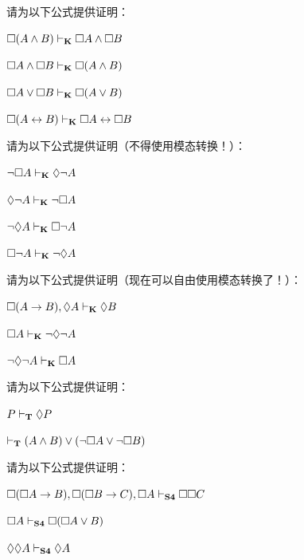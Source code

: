 \practiceproblems

\problempart
请为以下公式提供证明：

\begin{compactlist}
	\item $\Box (A\wedge B)\vdash_{\mathbf{K}}\Box A \wedge \Box B$
	\item $\Box A\wedge\Box B\vdash_{\mathbf{K}}\Box( A \wedge  B)$
	\item $\Box A\vee\Box B\vdash_{\mathbf{K}}\Box( A \vee  B)$
	\item $\Box (A \leftrightarrow B)\vdash_{\mathbf{K}} \Box A \leftrightarrow \Box B$
\end{compactlist}

\problempart
请为以下公式提供证明（不得使用模态转换！）：

\begin{compactlist}
	\item $\neg\Box A\vdash_{\mathbf{K}} \Diamond \neg A$
	\item $\Diamond\neg A\vdash_{\mathbf{K}}\neg \Box A$
	\item $\neg\Diamond A\vdash_{\mathbf{K}}\Box\neg A$
	\item $\Box\neg A\vdash_{\mathbf{K}}\neg\Diamond A$
\end{compactlist}

\problempart
请为以下公式提供证明（现在可以自由使用模态转换了！）：

\begin{compactlist}
	\item $\Box(A\rightarrow B), \Diamond A \vdash_{\mathbf{K}} \Diamond B$
	\item $\Box A \vdash_{\mathbf{K}} \neg\Diamond\neg A$
	\item $\neg\Diamond\neg A \vdash_{\mathbf{K}} \Box A$
\end{compactlist}

\problempart
请为以下公式提供证明：

\begin{compactlist}
	\item $P\vdash_{\mathbf{T}}\Diamond P$
	\item $\vdash_{\mathbf{T}} (A\wedge B)\vee(\neg \Box A\vee\neg\Box B)$
\end{compactlist}

\problempart
请为以下公式提供证明：

\begin{compactlist}
	\item $\Box(\Box A\rightarrow B), \Box (\Box B\rightarrow C), \Box A \vdash_{\mathbf{S4}} \Box\Box C$
	\item $\Box A \vdash_{\mathbf{S4}} \Box(\Box A \vee B)$
	\item $\Diamond \Diamond A \vdash_{\mathbf{S4}} \Diamond A$
\end{compactlist}

